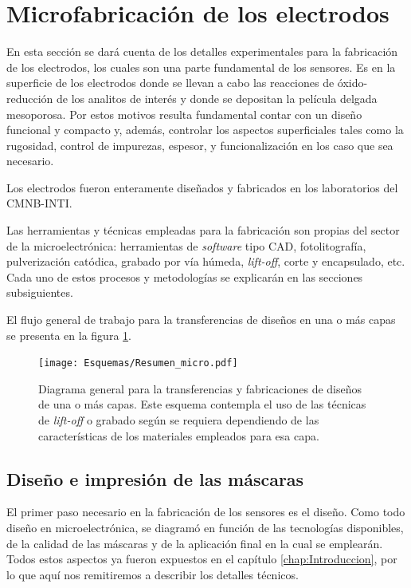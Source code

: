 \section{Microfabricación de los electrodos}
		
	 En esta sección se dará cuenta de los detalles experimentales para la fabricación de los electrodos, los cuales son una parte fundamental de los sensores. Es en la superficie de los electrodos donde se llevan a cabo las reacciones de óxido-reducción de los analitos de interés y donde se depositan la película delgada mesoporosa. Por estos motivos resulta fundamental contar con un diseño funcional y compacto y, además, controlar los aspectos superficiales tales como la rugosidad, control de impurezas, espesor, y funcionalización en los caso que sea necesario.

	 Los electrodos fueron enteramente diseñados y fabricados en los laboratorios del CMNB-INTI. 
		
	 Las herramientas y técnicas empleadas para la fabricación son propias del sector de la microelectrónica: herramientas de \textit{software} tipo CAD, fotolitografía, pulverización catódica, grabado por vía húmeda, \textit{lift-off}, corte y encapsulado, etc.\cite{Franssila2004,Jaeger2001} Cada uno de estos procesos y metodologías se explicarán en las secciones subsiguientes. 

	 El flujo general de trabajo para la transferencias de diseños en una o más capas se presenta en la figura \ref{esq:micro}.
			
			 \begin{figure}[h!]
			  \begin{center}
			  \texttt{[image: Esquemas/Resumen\_micro.pdf]}
			  \caption[Esquema para la transferencia de diseños]{Diagrama general para la transferencias y fabricaciones de diseños de una o más capas. Este esquema contempla el uso de las técnicas de \textit{lift-off }o grabado según se requiera dependiendo de las características de los materiales empleados para esa capa.}
			  \label{esq:micro}
			  \end{center}
			  \end{figure}

	\subsection{Diseño e impresión de las máscaras}\label{sec:impresion_mascaras}

		El primer paso necesario en la fabricación de los sensores es el diseño. Como todo diseño en microelectrónica, se diagramó en función de las tecnologías disponibles, de la calidad de las máscaras y de la aplicación final en la cual se emplearán. Todos estos aspectos ya fueron expuestos en el capítulo \ref{chap:Introduccion}, por lo que aquí nos remitiremos a describir los detalles técnicos.

